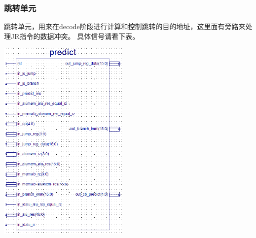 \subsubsection{跳转单元}
    跳转单元，用来在decode阶段进行计算和控制跳转的目的地址，这里面有旁路来处理JR指令的数据冲突。
    具体信号请看下表。
\begin{center}
    \includegraphics[height=10cm]{image/detail/detail_predict.png}
    \label{fig:predict}
\end{center}

